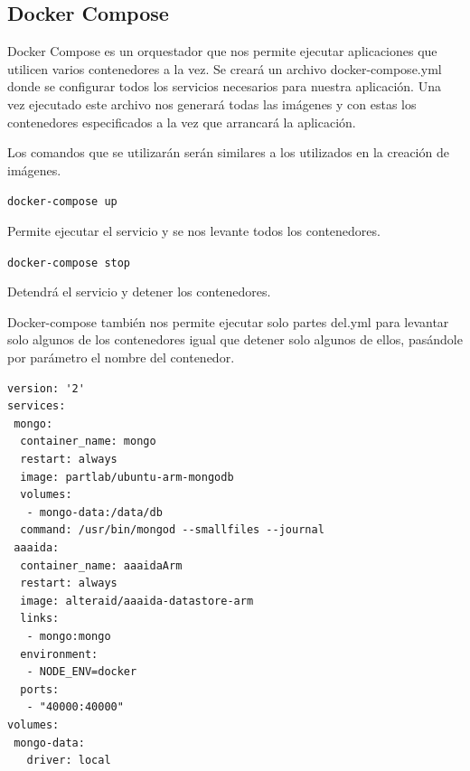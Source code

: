 \subsection{Docker Compose}

Docker Compose es un orquestador que nos permite ejecutar aplicaciones que utilicen varios contenedores a la vez.
Se creará un archivo docker-compose.yml donde se configurar todos los servicios necesarios para nuestra aplicación. Una vez ejecutado este archivo nos generará todas las imágenes y con estas los contenedores especificados a la vez que arrancará la aplicación.

Los comandos que se utilizarán serán similares a los utilizados en la creación de imágenes.

\begin{center}
\texttt{docker-compose up}
\end{center} 

Permite ejecutar el servicio y se nos levante todos los contenedores.

\begin{center}
\texttt{docker-compose stop}
\end{center} 

Detendrá el servicio y detener los contenedores. 
\pagebreak 

Docker-compose también nos permite ejecutar solo partes del.yml para levantar solo algunos de los contenedores igual que detener solo algunos de ellos, pasándole por parámetro el nombre del contenedor.

\begin{center}
\begin{verbatim}
version: '2'
services:
 mongo:
  container_name: mongo
  restart: always
  image: partlab/ubuntu-arm-mongodb
  volumes:
   - mongo-data:/data/db
  command: /usr/bin/mongod --smallfiles --journal
 aaaida:
  container_name: aaaidaArm
  restart: always
  image: alteraid/aaaida-datastore-arm
  links:
   - mongo:mongo 
  environment:
   - NODE_ENV=docker
  ports:
   - "40000:40000"
volumes:
 mongo-data:
   driver: local
\end{verbatim}
\end{center} 
